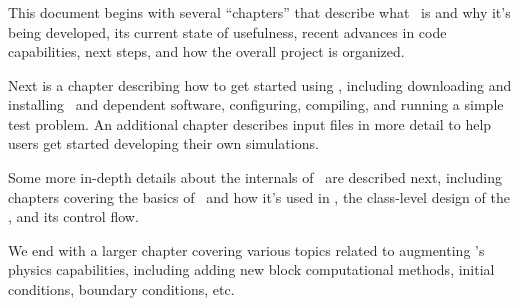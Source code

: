 \NEWSEC


\begin{frame}[fragile,label=ss-purpose] 
\frametitle{\ssPurpose}
\small
       This document begins with several ``chapters'' that describe
       what \enzopcello\ is and why it's being developed, its current
       state of usefulness, recent advances in code capabilities, next
       steps, and how the overall project is organized.

\vspace{0.1in}
       Next is a chapter describing how to get started
       using \enzop, including downloading and installing \enzopcello\
       and dependent software, configuring, compiling, and running a
       simple test problem.  An additional chapter describes input
       files in more detail to help users get started developing their
       own simulations.

\vspace{0.1in}
       Some more in-depth details about the internals of \enzopcello\
       are described next, including chapters covering the basics
       of \charm\ and how it's used in \enzopcello, the class-level
       design of the \enzopcello, and its control flow.

\vspace{0.1in}
       We end with a larger chapter covering various topics related to
       augmenting \enzop's physics capabilities, including adding new
       block computational methods, initial conditions, boundary
       conditions, etc.
       


\end{frame}

